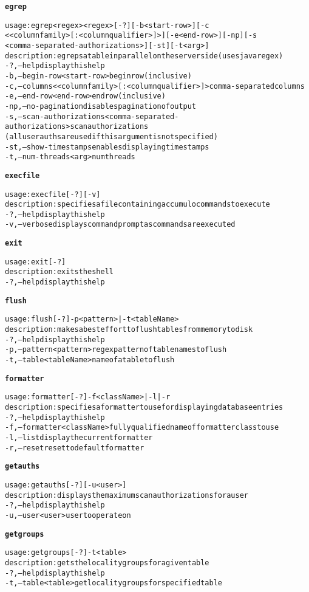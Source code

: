 \begin{alltt}
\textbf{egrep}

    usage: egrep <regex>{ <regex>} [-?] [-b <start-row>] [-c
    	      <{<columnfamily>[:<columnqualifier>]}>] [-e <end-row>] [-np] [-s
    	      <comma-separated-authorizations>] [-st] [-t <arg>]
    description: egreps a table in parallel on the server side (uses java regex)
      -?,--help  display this help
      -b,--begin-row <start-row>  begin row (inclusive)
      -c,--columns <{<columnfamily>[:<columnqualifier>]}>  comma-separated columns
      -e,--end-row <end-row>  end row (inclusive)
      -np,--no-pagination  disables pagination of output
      -s,--scan-authorizations <comma-separated-authorizations>  scan authorizations
    	      (all user auths are used if this argument is not specified)
      -st,--show-timestamps  enables displaying timestamps
      -t,--num-threads <arg>  num threads

\textbf{execfile}

    usage: execfile [-?] [-v]
    description: specifies a file containing accumulo commands to execute
      -?,--help  display this help
      -v,--verbose	displays command prompt as commands are executed

\textbf{exit}

    usage: exit [-?]
    description: exits the shell
      -?,--help  display this help

\textbf{flush}

    usage: flush [-?] -p <pattern> | -t <tableName>
    description: makes a best effort to flush tables from memory to disk
      -?,--help  display this help
      -p,--pattern <pattern>  regex pattern of table names to flush
      -t,--table <tableName>  name of a table to flush

\textbf{formatter}

    usage: formatter [-?] -f <className> | -l | -r
    description: specifies a formatter to use for displaying database entries
      -?,--help  display this help
      -f,--formatter <className>  fully qualified name of formatter class to use
      -l,--list  display the current formatter
      -r,--reset  reset to default formatter

\textbf{getauths}

    usage: getauths [-?] [-u <user>]
    description: displays the maximum scan authorizations for a user
      -?,--help  display this help
      -u,--user <user>  user to operate on

\textbf{getgroups}

    usage: getgroups [-?] -t <table>
    description: gets the locality groups for a given table
      -?,--help  display this help
      -t,--table <table>  get locality groups for specified table


\end{alltt}
